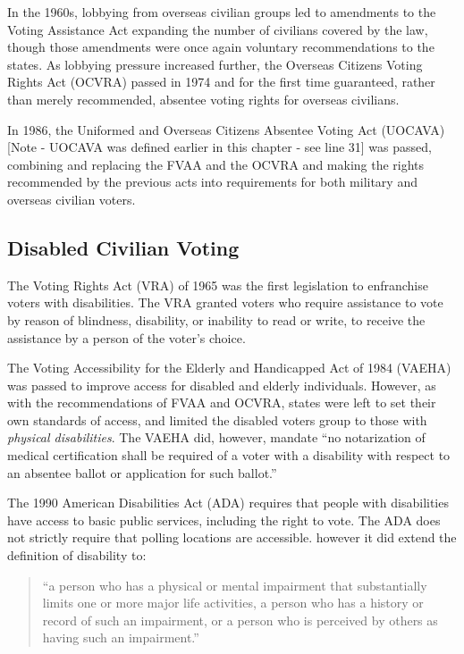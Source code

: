 In the 1960s, lobbying from overseas civilian groups led to amendments
to the Voting Assistance Act expanding the number of civilians covered
by the law, though those amendments were once again voluntary
recommendations to the states. As lobbying pressure increased further,
the Overseas Citizens Voting Rights Act (OCVRA) passed in 1974 and for the first
time guaranteed, rather than merely recommended, absentee voting
rights for overseas civilians.

In 1986, the Uniformed and Overseas Citizens Absentee Voting Act
(UOCAVA) [Note - UOCAVA was defined earlier in this chapter - see line 31] was passed, combining and replacing the FVAA and the OCVRA
and making the rights recommended by the previous acts into
requirements for both military and overseas civilian voters.

\subsection{Disabled Civilian Voting}
The Voting Rights Act (VRA) of 1965 was the first legislation to
enfranchise voters with disabilities. The VRA granted voters who
require assistance to vote by reason of blindness, disability, or
inability to read or write, to receive the assistance by a person of the voter's
choice.

The Voting Accessibility for the Elderly and Handicapped Act of 1984
(VAEHA) was passed to improve access for disabled and elderly
individuals. However, as with the recommendations of FVAA and OCVRA,
states were left to set their own standards of access, and limited the
disabled voters group to those with {\em physical disabilities}. The
VAEHA did, however, mandate ``no notarization of medical certification
shall be required of a voter with a disability with respect to an
absentee ballot or application for such ballot.''

The 1990 American Disabilities Act (ADA) requires that people with
disabilities have access to basic public services, including the right
to vote. The ADA does not strictly require that polling locations are
accessible. however it did extend the definition of disability to:
\begin{quote}
``a person who has a physical or mental impairment that substantially limits
one or more major life activities, a person who has a history or record of such
an impairment, or a person who is perceived by others as having such an
impairment.''
\end{quote}


